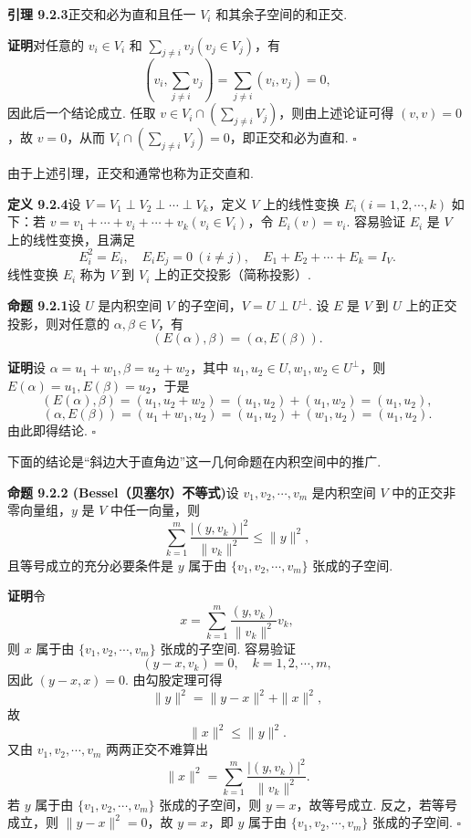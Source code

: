 \documentclass[UTF8,12pt,a4paper,fontset=fandol]{ctexart}
\begin{document}
\noindent\textbf{引理 9.2.3}\quad 正交和必为直和且任一 $V_i$ 和其余子空间的和正交.

\noindent\textbf{证明}\quad 对任意的 $v_i\in V_i$ 和 $\sum_{j\ne i}v_j(v_j\in V_j)$，有
\[
  \left(v_i,\sum_{j\ne i}v_j\right)=\sum_{j\ne i}(v_i,v_j)=0,
\]
因此后一个结论成立. 任取 $v\in V_i\cap\left(\sum_{j\ne i}V_j\right)$，则由上述论证可得 $(v,v)=0$，故 $v=0$，从而 $V_i\cap\left(\sum_{j\ne i}V_j\right)=0$，即正交和必为直和. $\square$

由于上述引理，正交和通常也称为正交直和.

\noindent\textbf{定义 9.2.4}\quad 设 $V=V_1\perp V_2\perp\cdots\perp V_k$，定义 $V$ 上的线性变换 $E_i(i=1,2,\cdots,k)$ 如下：若 $v=v_1+\cdots+v_i+\cdots+v_k(v_i\in V_i)$，令 $E_i(v)=v_i$. 容易验证 $E_i$ 是 $V$ 上的线性变换，且满足
\[
  E_i^2=E_i,\quad E_iE_j=0\ (i\ne j),\quad E_1+E_2+\cdots+E_k=I_V.
\]
线性变换 $E_i$ 称为 $V$ 到 $V_i$ 上的正交投影（简称投影）.

\noindent\textbf{命题 9.2.1}\quad 设 $U$ 是内积空间 $V$ 的子空间，$V=U\perp U^\perp$. 设 $E$ 是 $V$ 到 $U$ 上的正交投影，则对任意的 $\alpha,\beta\in V$，有
\[
  (E(\alpha),\beta)=(\alpha,E(\beta)).
\]

\noindent\textbf{证明}\quad 设 $\alpha=u_1+w_1,\beta=u_2+w_2$，其中 $u_1,u_2\in U,w_1,w_2\in U^\perp$，则 $E(\alpha)=u_1,E(\beta)=u_2$，于是
\[
  (E(\alpha),\beta)=(u_1,u_2+w_2)=(u_1,u_2)+(u_1,w_2)=(u_1,u_2),
\]
\[
  (\alpha,E(\beta))=(u_1+w_1,u_2)=(u_1,u_2)+(w_1,u_2)=(u_1,u_2).
\]
由此即得结论. $\square$

下面的结论是``斜边大于直角边''这一几何命题在内积空间中的推广.

\noindent\textbf{命题 9.2.2 (Bessel（贝塞尔）不等式)}\quad 设 $v_1,v_2,\cdots,v_m$ 是内积空间 $V$ 中的正交非零向量组，$y$ 是 $V$ 中任一向量，则
\[
  \sum_{k=1}^m\frac{|(y,v_k)|^2}{\|v_k\|^2}\le \|y\|^2,
\]
且等号成立的充分必要条件是 $y$ 属于由 $\{v_1,v_2,\cdots,v_m\}$ 张成的子空间.

\noindent\textbf{证明}\quad 令
\[
  x=\sum_{k=1}^m\frac{(y,v_k)}{\|v_k\|^2}v_k,
\]
则 $x$ 属于由 $\{v_1,v_2,\cdots,v_m\}$ 张成的子空间. 容易验证
\[
  (y-x,v_k)=0,\quad k=1,2,\cdots,m,
\]
因此 $(y-x,x)=0$. 由勾股定理可得
\[
  \|y\|^2=\|y-x\|^2+\|x\|^2,
\]
故
\[
  \|x\|^2\le \|y\|^2.
\]
又由 $v_1,v_2,\cdots,v_m$ 两两正交不难算出
\[
  \|x\|^2=\sum_{k=1}^m\frac{|(y,v_k)|^2}{\|v_k\|^2}.
\]
若 $y$ 属于由 $\{v_1,v_2,\cdots,v_m\}$ 张成的子空间，则 $y=x$，故等号成立. 反之，若等号成立，则 $\|y-x\|^2=0$，故 $y=x$，即 $y$ 属于由 $\{v_1,v_2,\cdots,v_m\}$ 张成的子空间. $\square$
\end{document}
